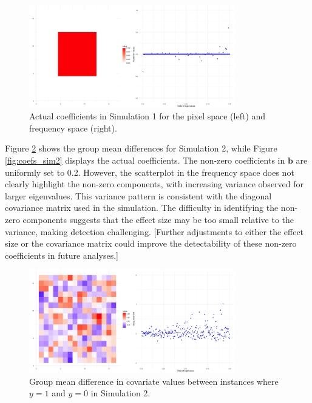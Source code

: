 \documentclass[12pt]{article}
\begin{document}
\begin{figure}[h!]
	\centering
	\includegraphics[width=0.8\textwidth, height=0.35\textwidth]{actual_coefs_sim1.png}
	\caption{Actual coefficients in Simulation 1 for the pixel space (left) and frequency space (right).}
	\label{fig:coefs_sim1}
\end{figure}

Figure \ref{fig:group_diff2} shows the group mean differences for Simulation 2, while Figure \ref{fig:coefs_sim2} displays the actual coefficients. The non-zero coefficients in \( \mathbf{b} \) are uniformly set to 0.2. However, the scatterplot in the frequency space does not clearly highlight the non-zero components, with increasing variance observed for larger eigenvalues. This variance pattern is consistent with the diagonal covariance matrix used in the simulation. The difficulty in identifying the non-zero components suggests that the effect size may be too small relative to the variance, making detection challenging. [Further adjustments to either the effect size or the covariance matrix could improve the detectability of these non-zero coefficients in future analyses.]

\begin{figure}[h!]
	\centering
	\includegraphics[width=0.8\textwidth, height=0.35\textwidth]{group_mean_diff_sim2.png}
	\caption{Group mean difference in covariate values between instances where \( y = 1 \) and \( y = 0 \) in Simulation 2.}
	\label{fig:group_diff2}
\end{figure}
\end{document}
